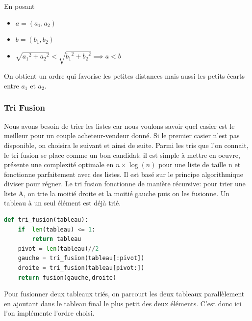 \documentclass[11pt]{article}
\begin{document}
En posant
\begin{itemize}
\item $a=(a_1, a_2) $
\item $b=(b_1, b_2)$ 
\item $\sqrt{{a_1}^2+{a_2}^2}<\sqrt{{b_1}^2+{b_2}^2}\implies a <b $
\end{itemize}
\vspace{0.4cm}

On obtient un ordre qui favorise les petites distances mais aussi les petits écarts entre $a_1$ et $a_2$.

\subsubsection{Tri Fusion}
Nous avons besoin de trier les listes car nous voulons savoir quel casier est le meilleur pour un couple acheteur-vendeur donné. Si le premier casier n'est pas disponible, on choisira le suivant et ainsi de suite.
Parmi les tris que l'on connait, le tri fusion se place comme un bon candidat: il est simple à mettre en oeuvre, présente une complexité optimale en $n\times\log(n)$ pour une liste de taille n et fonctionne parfaitement avec des listes.
Il est basé sur le principe algorithmique diviser pour régner. Le tri fusion fonctionne de manière récursive: pour trier une liste A, on trie la moitié droite et la moitié gauche puis on les fusionne. Un tableau à un seul élément est déjà trié.

\begin{lstlisting}[language=python, caption={Appel recursif}]
def tri_fusion(tableau):
    if  len(tableau) <= 1: 
        return tableau
    pivot = len(tableau)//2
    gauche = tri_fusion(tableau[:pivot])
    droite = tri_fusion(tableau[pivot:])
    return fusion(gauche,droite)
\end{lstlisting}

Pour fusionner deux tableaux triés, on parcourt les deux tableaux parallèlement en ajoutant dans le tableau final le plus petit des deux éléments.
C'est donc ici l'on implémente l'ordre choisi. 
\end{document}

